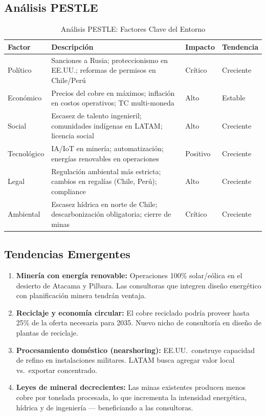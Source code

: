 \subsection{Análisis PESTLE}

\begin{table}[htbp]
\centering
\caption{Análisis PESTLE: Factores Clave del Entorno}
\begin{tabular}{@{}p{2cm}p{5.5cm}p{2cm}p{2.5cm}@{}}
\toprule
\textbf{Factor} & \textbf{Descripción} & \textbf{Impacto} & \textbf{Tendencia} \\
\midrule
Político & Sanciones a Rusia; proteccionismo en EE.UU.; reformas de permisos en Chile/Perú & Crítico & \trendup{} Creciente \\
\rowcolor{tablealt} Económico & Precios del cobre en máximos; inflación en costos operativos; TC multi-moneda & Alto & \trendflat{} Estable \\
Social & Escasez de talento ingenieril; comunidades indígenas en LATAM; licencia social & Alto & \trendup{} Creciente \\
\rowcolor{tablealt} Tecnológico & IA/IoT en minería; automatización; energías renovables en operaciones & Positivo & \trendup{} Creciente \\
Legal & Regulación ambiental más estricta; cambios en regalías (Chile, Perú); compliance & Alto & \trendup{} Creciente \\
\rowcolor{tablealt} Ambiental & Escasez hídrica en norte de Chile; descarbonización obligatoria; cierre de minas & Crítico & \trendup{} Creciente \\
\bottomrule
\end{tabular}
\label{tab:pestle}
\end{table}

\subsection{Tendencias Emergentes}

\begin{enumerate}
    \item \textbf{Minería con energía renovable:} Operaciones 100\% solar/eólica en el desierto de Atacama y Pilbara. Las consultoras que integren diseño energético con planificación minera tendrán ventaja.
    \item \textbf{Reciclaje y economía circular:} El cobre reciclado podría proveer hasta 25\% de la oferta necesaria para 2035. Nuevo nicho de consultoría en diseño de plantas de reciclaje.
    \item \textbf{Procesamiento doméstico (nearshoring):} EE.UU.\ construye capacidad de refino en instalaciones militares. LATAM busca agregar valor local vs.\ exportar concentrado.
    \item \textbf{Leyes de mineral decrecientes:} Las minas existentes producen menos cobre por tonelada procesada, lo que incrementa la intensidad energética, hídrica y de ingeniería — beneficiando a las consultoras.
\end{enumerate}
